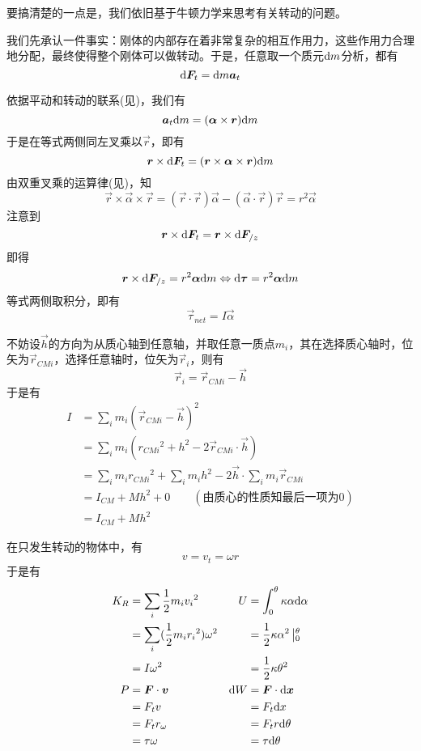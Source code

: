\chapter[转动动力学]{}
\begin{prove}[Concepts in Dynamics\qquad$\vec{\tau}_{net}=I\vec{\alpha}$]
	要搞清楚的一点是，我们依旧基于牛顿力学来思考有关转动的问题。
	
	我们先承认一件事实：刚体的内部存在着非常复杂的相互作用力，这些作用力合理地分配，最终使得整个刚体可以做转动。于是，任意取一个质元$\mathrm{d} m$分析，都有\[\mathrm{d} \boldsymbol{F}_t=\mathrm{d} m\boldsymbol{a}_t\]
	
	依据平动和转动的联系(见)，我们有
	\[\boldsymbol{a}_t\mathrm{d} m=(\boldsymbol{\alpha}\times\boldsymbol{r})\mathrm{d} m\]
	于是在等式两侧同左叉乘以$\vec{r}$，即有
	\[\boldsymbol{r}\times\mathrm{d}\boldsymbol{F}_t= (\boldsymbol{r}\times\boldsymbol{\alpha}\times\boldsymbol{r})\mathrm{d} m\]
	由双重叉乘的运算律(见)，知
	\[\vec{r}\times\vec{\alpha}\times\vec{r}=(\vec{r}\cdot\vec{r})\vec{\alpha}-(\vec{\alpha}\cdot\vec{r})\vec{r}=r^2\vec{\alpha}\]
	注意到
	\[\boldsymbol{r}\times\mathrm{d}\boldsymbol{F}_t=\boldsymbol{r}\times\mathrm{d}\boldsymbol{F}_{/z}\]
	即得
	\[\boldsymbol{r}\times\mathrm{d}\boldsymbol{F}_{/z}=r^2\boldsymbol{\alpha}\mathrm{d} m\Leftrightarrow\mathrm{d}\boldsymbol{\tau}=r^2\boldsymbol{\alpha}\mathrm{d} m\]
	等式两侧取积分，即有
	\[\vec{\tau}_{net}=I\vec{\alpha}\]
\end{prove}
\newpage
\begin{prove}[\itr{Parallel Axis Theorem}{平行轴定理}\qquad$I=I_{CM}+Mh^2$]
	不妨设$\vec{h}$的方向为从质心轴到任意轴，并取任意一质点$m_i$，其在选择质心轴时，位矢为$\vec{r}_{CMi}$，选择任意轴时，位矢为$\vec{r}_i$，则有\[\vec{r}_i=\vec{r}_{CMi}-\vec{h}\]
	于是有
	\begin{align*}
		I&=\sum_{i}m_i(\vec{r}_{CMi}-\vec{h})^2\\
		&=\sum_{i}m_i(r_{CMi}{}^2+h^2-2\vec{r}_{CMi}\cdot\vec{h})\\
		&=\sum_{i}m_ir_{CMi}{}^2+\sum_{i}m_ih^2-2\vec{h}\cdot\sum_{i}m_i\vec{r}_{CMi}\\
		&=I_{CM}+Mh^2+0\qquad(\text{由质心的性质知最后一项为0})\\
		&=I_{CM}+Mh^2
	\end{align*}
\end{prove}
\begin{prove}
	在只发生转动的物体中，有\[v=v_t=\omega r\]于是有
	\begin{align*}
		K_R&=\sum_i\dfrac{1}{2}m_iv_i{}^2&U&=\int_0^{\theta}\kappa\alpha\mathrm{d}\alpha\\
		&=\sum_i(\dfrac{1}{2}m_i r_i{}^2)\omega^2&&=\dfrac{1}{2}\kappa\alpha^2\left|_0^{\theta}\right.\\
		&=I\omega^2&&=\dfrac{1}{2}\kappa\theta^2\\
		P&=\boldsymbol{F}\cdot \boldsymbol{v}&\mathrm{d} W&=\boldsymbol{F}\cdot\mathrm{d} \boldsymbol{x}\\
		&=F_tv&&=F_t\mathrm{d} x\\
		&=F_tr_\omega&&=F_tr\mathrm{d}\theta\\
		&=\tau\omega&&=\tau\mathrm{d}\theta
	\end{align*}
\end{prove}
